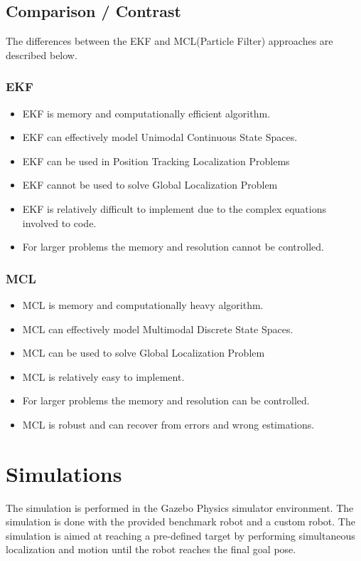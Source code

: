 \documentclass[10pt,journal,compsoc]{IEEEtran}
\begin{document}
\subsection{Comparison / Contrast}
The differences between the EKF and MCL(Particle Filter) approaches are described below.

\subsubsection{EKF}
\begin{itemize}
\item EKF is memory and computationally efficient algorithm.
\item EKF can effectively model Unimodal Continuous State Spaces.
\item EKF can be used in Position Tracking Localization Problems
\item EKF cannot be used to solve Global Localization Problem
\item EKF is relatively difficult to implement due to the complex equations involved to code.
\item For larger problems the memory and resolution cannot be controlled. 
\end {itemize}

\subsubsection{MCL}
\begin{itemize}
\item MCL is memory and computationally heavy algorithm.
\item MCL can effectively model Multimodal Discrete State Spaces.
\item MCL can be used to solve Global Localization Problem
\item MCL is relatively easy to implement.
\item For larger problems the memory and resolution can be controlled. 
\item MCL is robust and can recover from errors and wrong estimations.
\end {itemize}

\section{Simulations}
The simulation is performed in the Gazebo Physics simulator environment. The simulation is done with the provided benchmark robot and a custom robot. The simulation is aimed at reaching a pre-defined target by performing simultaneous localization and motion until the robot reaches the final goal pose.
\end{document}
